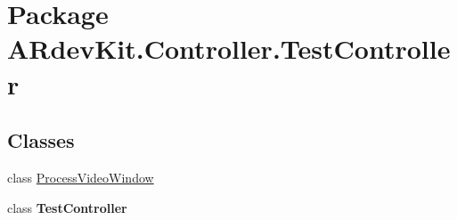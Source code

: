 \hypertarget{namespace_a_rdev_kit_1_1_controller_1_1_test_controller}{\section{Package A\-Rdev\-Kit.\-Controller.\-Test\-Controller}
\label{namespace_a_rdev_kit_1_1_controller_1_1_test_controller}
}
\subsection*{Classes}
\begin{DoxyCompactItemize}
\item 
class \hyperlink{class_a_rdev_kit_1_1_controller_1_1_test_controller_1_1_process_video_window}{Process\-Video\-Window}
\item 
class {\bfseries Test\-Controller}
\end{DoxyCompactItemize}
